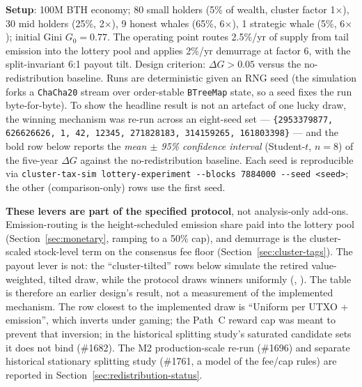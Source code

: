 \textbf{Setup}: 100M BTH economy; 80 small holders (5\% of wealth, cluster
factor 1$\times$), 30 mid holders (25\%, 2$\times$), 9 honest whales (65\%,
6$\times$), 1 strategic whale (5\%, 6$\times$); initial Gini $G_0 = 0.77$.
The operating point routes 2.5\%/yr of supply from tail emission into the
lottery pool and applies 2\%/yr demurrage at factor 6, with the split-invariant
6:1 payout tilt. Design criterion: $\Delta G > 0.05$ versus the
no-redistribution baseline. Runs are deterministic given an RNG seed (the
simulation forks a \texttt{ChaCha20} stream over order-stable
\texttt{BTreeMap} state, so a seed fixes the run byte-for-byte). To show the
headline result is not an artefact of one lucky draw, the winning mechanism
was re-run across an eight-seed set --- \texttt{\{2953379877, 626626626, 1,
42, 12345, 271828183, 314159265, 161803398\}} --- and the bold row below
reports the \emph{mean $\pm$ 95\% confidence interval} (Student-$t$, $n=8$) of
the five-year $\Delta G$ against the no-redistribution baseline. Each seed is
reproducible via \texttt{cluster-tax-sim lottery-experiment -{}-blocks 7884000
-{}-seed <seed>}; the other (comparison-only) rows use the first seed.

\textbf{These levers are part of the specified protocol}, not analysis-only
add-ons. Emission-routing is the height-scheduled emission share paid into the
lottery pool (Section~\ref{sec:monetary}, ramping to a 50\% cap), and
demurrage is the cluster-scaled stock-level term on the consensus fee floor
(Section~\ref{sec:cluster-tags}). The payout lever is not: the
``cluster-tilted'' rows below simulate the retired value-weighted, tilted
draw, while the protocol draws winners uniformly
(, ).
The table is therefore an earlier design's result, not a measurement of the
implemented mechanism. The row closest to the implemented draw is ``Uniform per UTXO
+ emission'', which inverts under gaming; the Path~C reward cap was meant to
prevent that inversion; in the historical splitting study's saturated
candidate sets it does not bind (\#1682). The
M2 production-scale re-run (\#1696) and separate historical stationary
splitting study (\#1761, a model of the fee/cap rules) are reported in
Section~\ref{sec:redistribution-status}.

